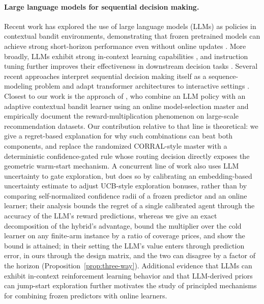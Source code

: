 \documentclass{article}
\theoremstyle{definition}
\theoremstyle{remark}
\theoremstyle{remark}
\begin{document}
\paragraph{Large language models for sequential decision making.}
Recent work has explored the use of large language models (LLMs) as policies
in contextual bandit environments, demonstrating that frozen pretrained
models can achieve strong short-horizon performance even without online
updates \cite{chen2024llmdecision}. More broadly, LLMs exhibit strong
in-context learning capabilities \cite{brown2020language,xie2021explanation,
garg2022can,akyurek2022learning}, and instruction tuning further improves
their effectiveness in downstream decision tasks
\cite{ouyang2022training,chung2024scaling}. Several recent approaches
interpret sequential decision making itself as a sequence-modeling problem
and adapt transformer architectures to interactive settings
\cite{chen2021decision,zheng2022online,reid2022can,sun2023smart,
raparthy2023generalization,lee2023supervised}.
Closest to our work is the approach of \cite{chen2024llmdecision}, who
combine an LLM policy with an adaptive contextual bandit learner using an
online model-selection master and empirically document the
reward-multiplication phenomenon on large-scale recommendation datasets.
Our contribution relative to that line is theoretical: we give a
regret-based explanation for why such combinations can beat both components,
and replace the randomized CORRAL-style master with a deterministic
confidence-gated rule whose routing decision directly exposes the geometric
warm-start mechanism. A concurrent line of work \cite{huangcontextual} also
uses LLM uncertainty to gate exploration, but does so by calibrating an
embedding-based uncertainty estimate to adjust UCB-style exploration
bonuses, rather than by comparing self-normalized confidence radii of a
frozen predictor and an online learner; their analysis bounds the regret
of a single calibrated agent through the accuracy of the LLM's reward
predictions, whereas we give an exact decomposition of the hybrid's
advantage, bound the multiplier over the cold learner on any finite-arm
instance by a ratio of coverage prices, and show the bound is attained; in
their setting the LLM's value enters through prediction error, in ours
through the design matrix, and the two can disagree by a factor of the
horizon (Proposition~\ref{prop:three-way}). Additional evidence that LLMs can
exhibit in-context reinforcement learning behavior
\cite{monea2024llms,krishnamurthy2024can} and that LLM-derived priors can
jump-start exploration \cite{alamdari2024jumpstarting,abbasiyadkori2024believe}
further motivates the study of principled mechanisms for combining frozen
predictors with online learners.
\end{document}
